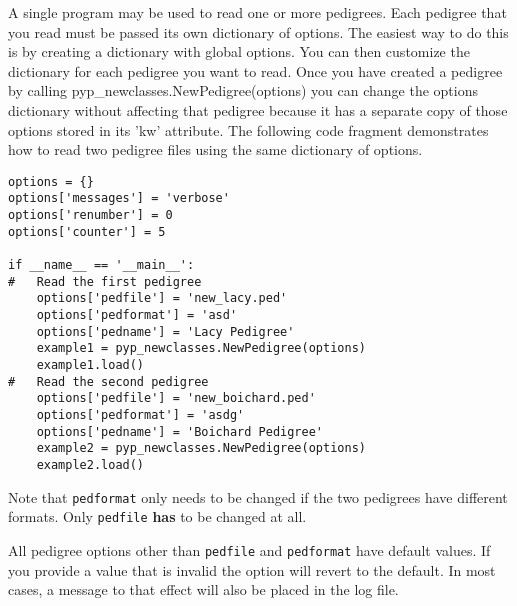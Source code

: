 A single \PyPedal{} program may be used to read one or more pedigrees.  Each pedigree that you read must be passed its own dictionary of options.  The easiest way to do this is by creating a dictionary with global options.  You can then customize the dictionary for each pedigree you want to read.  Once you have created a \PyPedal{} pedigree by calling pyp_newclasses.NewPedigree(options) you can change the options dictionary without affecting that pedigree because it has a separate copy of those options stored in its 'kw' attribute.  The following code fragment demonstrates how to read two pedigree files using the same dictionary of options.
\begin{verbatim}
options = {}
options['messages'] = 'verbose'
options['renumber'] = 0
options['counter'] = 5

if __name__ == '__main__':
#   Read the first pedigree
    options['pedfile'] = 'new_lacy.ped'
    options['pedformat'] = 'asd'
    options['pedname'] = 'Lacy Pedigree'
    example1 = pyp_newclasses.NewPedigree(options)
    example1.load()
#   Read the second pedigree
    options['pedfile'] = 'new_boichard.ped'
    options['pedformat'] = 'asdg'
    options['pedname'] = 'Boichard Pedigree'
    example2 = pyp_newclasses.NewPedigree(options)
    example2.load()
\end{verbatim}
Note that \texttt{pedformat} only needs to be changed if the two pedigrees have different formats.  Only \texttt{pedfile} \textbf{has} to be changed at all.

All pedigree options other than \texttt{pedfile} and \texttt{pedformat} have default values.  If you provide a value that is invalid the option will revert to the default.  In most cases, a message to that effect will also be placed in the log file.

